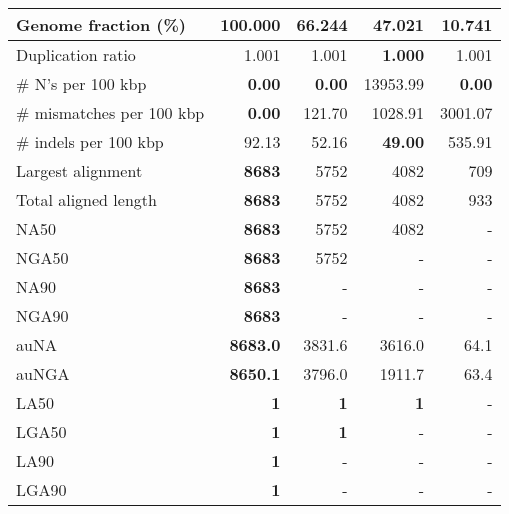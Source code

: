 \documentclass[12pt,a4paper]{article}
\begin{document}
\begin{table}[ht]
\begin{center}
\begin{tabular}{|l*{4}{|r}|}
Genome fraction (\%) & {\bf 100.000} & 66.244 & 47.021 & 10.741 \\ \hline
Duplication ratio & 1.001 & 1.001 & {\bf 1.000} & 1.001 \\ \hline
\# N's per 100 kbp & {\bf 0.00} & {\bf 0.00} & 13953.99 & {\bf 0.00} \\ \hline
\# mismatches per 100 kbp & {\bf 0.00} & 121.70 & 1028.91 & 3001.07 \\ \hline
\# indels per 100 kbp & 92.13 & 52.16 & {\bf 49.00} & 535.91 \\ \hline
Largest alignment & {\bf 8683} & 5752 & 4082 & 709 \\ \hline
Total aligned length & {\bf 8683} & 5752 & 4082 & 933 \\ \hline
NA50 & {\bf 8683} & 5752 & 4082 & - \\ \hline
NGA50 & {\bf 8683} & 5752 & - & - \\ \hline
NA90 & {\bf 8683} & - & - & - \\ \hline
NGA90 & {\bf 8683} & - & - & - \\ \hline
auNA & {\bf 8683.0} & 3831.6 & 3616.0 & 64.1 \\ \hline
auNGA & {\bf 8650.1} & 3796.0 & 1911.7 & 63.4 \\ \hline
LA50 & {\bf 1} & {\bf 1} & {\bf 1} & - \\ \hline
LGA50 & {\bf 1} & {\bf 1} & - & - \\ \hline
LA90 & {\bf 1} & - & - & - \\ \hline
LGA90 & {\bf 1} & - & - & - \\ \hline
\end{tabular}
\end{center}
\end{table}
\end{document}
